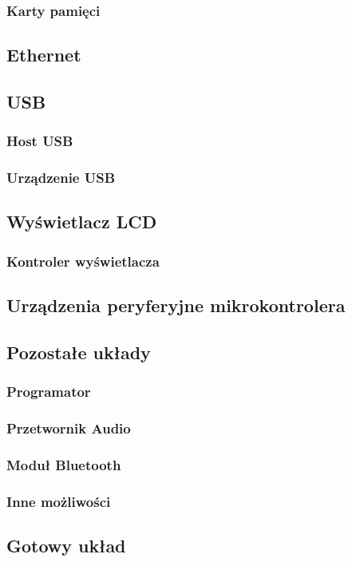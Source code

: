 \documentclass[a4paper]{article}
\begin{document}
			\subsubsection{Karty pamięci}
		\subsection{Ethernet}
		\subsection{USB}
			\subsubsection{Host USB}
			\subsubsection{Urządzenie USB}
		\subsection{Wyświetlacz LCD}
			\subsubsection{Kontroler wyświetlacza}
		\subsection{Urządzenia peryferyjne mikrokontrolera}
		\subsection{Pozostałe układy}
			\subsubsection{Programator}
			\subsubsection{Przetwornik Audio}
			\subsubsection{Moduł Bluetooth}
			\subsubsection{Inne możliwości}
		\subsection{Gotowy układ}
\end{document}
